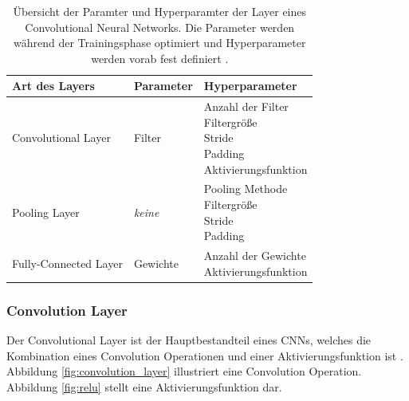 \begin{table}[H]
	\centering
	\caption{Übersicht der Paramter und Hyperparamter der Layer eines Convolutional Neural Networks. Die Parameter werden während der Trainingsphase optimiert und Hyperparameter werden vorab fest definiert \cite{yamashitaConvolutionalNeuralNetworks2018}. }
	\begin{tabularx}{1.0\textwidth}{X X X}
		\textbf{Art des Layers} & \textbf{Parameter} & \textbf{Hyperparameter}\\
		\hline
		Convolutional Layer & Filter & \makecell[tl]{
			Anzahl der Filter\\
			Filtergröße\\
			Stride\\
			Padding\\
			Aktivierungsfunktion
		}\\
		\hline
		Pooling Layer &  \textit{keine}  & \makecell[tl]{
			Pooling Methode\\
			Filtergröße\\
			Stride\\
			Padding
		}\\
		\hline
		Fully-Connected Layer & Gewichte & \makecell[tl]{
			Anzahl der Gewichte\\
			Aktivierungsfunktion
		}\\
		\hline
	\end{tabularx}
	\label{tab:layer_param}
\end{table}

\subsubsection{Convolution Layer}
Der Convolutional Layer ist der Hauptbestandteil eines CNNs, welches die Kombination eines Convolution Operationen und einer Aktivierungsfunktion ist \cite{yamashitaConvolutionalNeuralNetworks2018}. 
Abbildung \ref{fig:convolution_layer} illustriert eine Convolution Operation. Abbildung \ref{fig:relu} stellt eine Aktivierungsfunktion dar.


